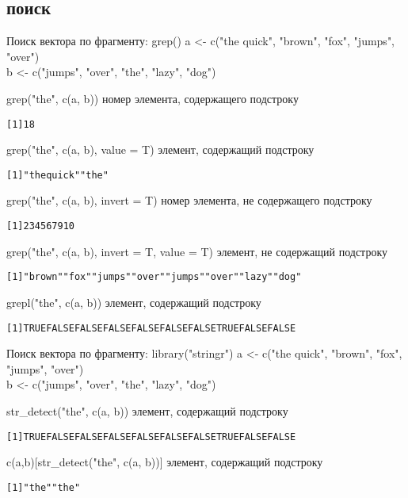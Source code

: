 \subsection{поиск}
\begin{frame}[fragile]{Поиск вектора по фрагменту: grep()}
a <- c("the quick"{}, "brown"{}, "fox"{}, "jumps"{}, "over"{})\\
b <- c("jumps"{}, "over"{}, "the"{}, "lazy"{}, "dog"{})
\begin{itemize}
\vfill
\mytem grep("the"{}, c(a, b)) \hfill номер элемента, содержащего подстроку
\footnotesize
\begin{alltt}
[1] 1 8
\end{alltt}
\normalsize
\vfill
\mytem grep("the"{}, c(a, b), value = T) \hfill элемент, содержащий подстроку
\footnotesize
\begin{alltt}
[1] "the quick" "the"
\end{alltt}
\normalsize
\vfill
\mytem grep("the"{}, c(a, b), invert = T) \hfill номер элемента, не содержащего подстроку
\footnotesize
\begin{alltt}
[1]  2  3  4  5  6  7  9 10
\end{alltt}
\normalsize
\vfill
\mytem grep("the"{}, c(a, b), invert = T, value = T) \hfill элемент, не содержащий подстроку
\footnotesize
\begin{alltt}
[1] "brown" "fox"   "jumps" "over"  "jumps" "over"  "lazy"  "dog"
\end{alltt}
\normalsize
\vfill
\mytem grepl("the"{}, c(a, b)) \hfill элемент, содержащий подстроку
\scriptsize
\begin{alltt}
[1] TRUE FALSE FALSE FALSE FALSE FALSE FALSE  TRUE FALSE FALSE
\end{alltt}
\normalsize
\end{itemize}
\end{frame}
\begin{frame}[fragile]{Поиск вектора по фрагменту: library("stringr")}
a <- c("the quick"{}, "brown"{}, "fox"{}, "jumps"{}, "over"{})\\
b <- c("jumps"{}, "over"{}, "the"{}, "lazy"{}, "dog"{})
\begin{itemize}
\mytem str\_detect("the"{}, c(a, b)) \hfill элемент, содержащий подстроку
\scriptsize
\begin{alltt}
[1] TRUE FALSE FALSE FALSE FALSE FALSE FALSE  TRUE FALSE FALSE
\end{alltt}
\normalsize
\mytem c(a,b)[str\_detect("the", c(a, b))] \hfill элемент, содержащий подстроку
\scriptsize
\begin{alltt}
[1] "the" "the"
\end{alltt}
\normalsize
\end{itemize}
\end{frame}
